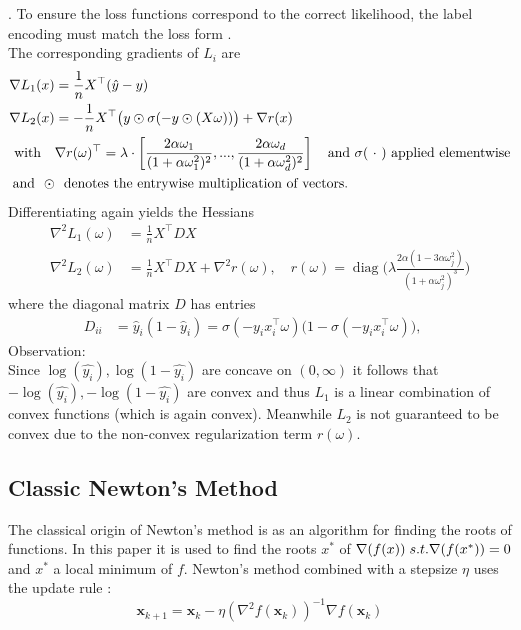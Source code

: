 \documentclass{article}
\begin{document}
\cite[Eq.~8.4]{murphy2012ml}.
To ensure the loss functions correspond to the correct likelihood, the label encoding must match the loss form \cite[Sec.~8.3.1]{murphy2012ml}.\\
The corresponding gradients of $L_i$ are
\begin{align}
\nabla L_1(x) &= \frac{1}{n} X^\top (\hat{y} - y) \\
\nabla L_2(x) &= -\frac{1}{n} X^\top \big(y \odot \sigma(-y \odot (X\omega))\big) + \nabla r(x)\\
\text{with}\quad & \nabla r(\omega)^\top = \lambda \cdot \left[ \frac{2\alpha \omega _1}{(1 + \alpha \omega _1^2)^2},...,\frac{2\alpha \omega _d}{(1 + \alpha \omega _d^2)^2} \right] \quad \text{and $\sigma(\ \cdot \ )$ applied  elementwise}\notag\\
\text{and} \ \ \odot& \ \ \text{denotes the entrywise multiplication of vectors.}\notag
\end{align}
Differentiating again yields the Hessians
\begin{align}
\nabla^2 L_1(\omega) &= \frac{1}{n} X^\top D X\\
\nabla^2 L_2(\omega) &= \frac{1}{n} X^\top D X + \nabla^2 r(\omega), \quad
r(\omega) = \operatorname{diag}\Big(\lambda \frac{2\alpha (1 - 3\alpha \omega_j^2)}{(1 + \alpha \omega_j^2)^3}\Big)
\end{align}
where the diagonal matrix $D$ has entries
\begin{align}
D_{ii} &= \hat{y}_i (1 - \hat{y}_i)=  \sigma(-y_i x_i^\top \omega) \big(1 - \sigma(-y_i x_i^\top \omega)\big),\quad 
\end{align}
Observation:\\
Since $\log(\hat{y_i}),\log(1-\hat{y_i})$ are concave on $(0,\infty)$ it follows that $-\log(\hat{y_i}),-\log(1-\hat{y_i})$ are convex and thus $L_1$ is a linear combination of convex functions (which is again convex). Meanwhile $L_2$ is not guaranteed to be convex due to the non-convex regularization term $r(\omega)$. 

\subsection{Classic Newton's Method}

The classical origin of Newton's method is as an algorithm for finding the roots of functions. In this paper it is used to find the roots $x^{*}$ of $\nabla (f(x)) \hspace{0.1cm} s.t.\nabla(f(x^{*})) = 0$ and $x^{*}$ a local minimum of $f$. Newton's method combined with a stepsize $\eta$ uses the update rule \cite{wright}:
\begin{equation}
  \mathbf{x}_{k+1} = \mathbf{x}_k - \eta (\nabla^2 f(\mathbf{x}_k))^{-1} \nabla f(\mathbf{x}_k)
\end{equation}
\end{document}
